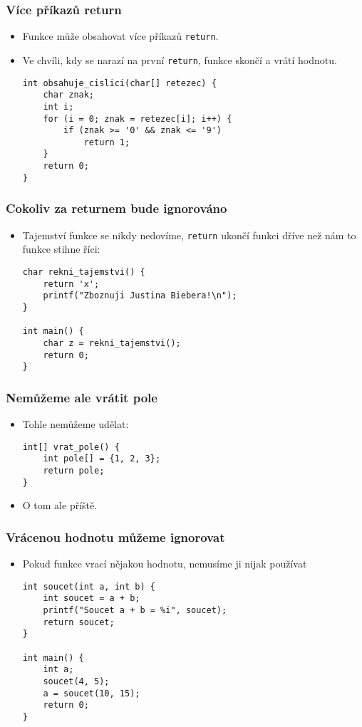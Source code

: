 \documentclass{beamer}
\newenvironment{itemizex}%
  {\large \begin{itemize}%
    \setlength{\itemsep}{8pt}%
    \setlength{\parskip}{8pt}}%
  {\end{itemize}}
\begin{document}
\begin{frame}[t,fragile]\frametitle{Více příkazů return} 
    \begin{itemizex}
        \item Funkce může obsahovat více příkazů \texttt{return}.
        \item Ve chvíli, kdy se narazí na první \texttt{return}, funkce skončí a vrátí hodnotu.
        \begin{verbatim} 
int obsahuje_cislici(char[] retezec) {
    char znak;
    int i;
    for (i = 0; znak = retezec[i]; i++) {
        if (znak >= '0' && znak <= '9') 
            return 1;
    }
    return 0;
}
        \end{verbatim}
    \end{itemizex}
\end{frame}


\begin{frame}[t,fragile]\frametitle{Cokoliv za returnem bude ignorováno} 
    \begin{itemizex}
        \item Tajemství funkce se nikdy nedovíme, \texttt{return} ukončí funkci dříve než nám to funkce stihne říci:
        \begin{verbatim} 
char rekni_tajemstvi() {
    return 'x';
    printf("Zboznuji Justina Biebera!\n");
}

int main() {
    char z = rekni_tajemstvi();
    return 0;
}
        \end{verbatim}
    \end{itemizex}
\end{frame}


\begin{frame}[t,fragile]\frametitle{Nemůžeme ale vrátit pole} 
    \begin{itemizex}
        \item Tohle nemůžeme udělat:
        \begin{verbatim} 
int[] vrat_pole() {
    int pole[] = {1, 2, 3};
    return pole;
}
        \end{verbatim}
        \item  O tom ale příště.
    \end{itemizex}
\end{frame}


\begin{frame}[t,fragile]\frametitle{Vrácenou hodnotu můžeme ignorovat} 
    \begin{itemize}
        \item Pokud funkce vrací nějakou hodnotu, nemusíme ji nijak používat
        \begin{verbatim} 
int soucet(int a, int b) {
    int soucet = a + b;
    printf("Soucet a + b = %i", soucet);
    return soucet;
}

int main() {
    int a;
    soucet(4, 5);
    a = soucet(10, 15);
    return 0;
}
        \end{verbatim}
    \end{itemize}
\end{frame}
\end{document}
